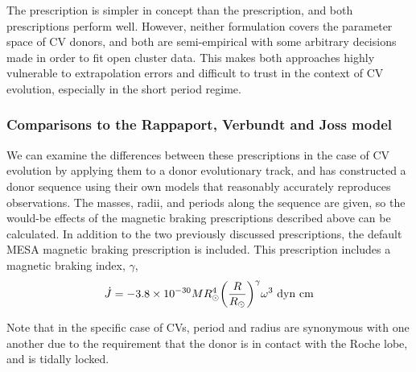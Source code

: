 The \citet{garraffo2018a} prescription is simpler in concept than the \citet{matt2015} prescription, and both prescriptions perform well. However, neither formulation covers the parameter space of CV donors, and both are semi-empirical with some arbitrary decisions made in order to fit open cluster data. This makes both approaches highly vulnerable to extrapolation errors and difficult to trust in the context of CV evolution, especially in the short period regime.


\subsubsection{Comparisons to the Rappaport, Verbundt and Joss model}

We can examine the differences between these prescriptions in the case of CV evolution by applying them to a donor evolutionary track, and \citet{knigge11} has constructed a donor sequence using their own models that reasonably accurately reproduces observations. The masses, radii, and periods along the sequence are given, so the would-be effects of the magnetic braking prescriptions described above can be calculated. In addition to the two previously discussed prescriptions, the default MESA \citep{Paxton_2015} magnetic braking prescription \citep{rappaport1983} is included. This prescription includes a magnetic braking index, $\gamma$,
\begin{equation}
    \dot J = -3.8\times10^{-30} M R_\odot^4 \bigg( \frac{R}{R_\odot} \bigg)^\gamma \omega^3\  {\rm dyn\ cm}
\end{equation}

Note that in the specific case of CVs, period and radius are synonymous with one another due to the requirement that the donor is in contact with the Roche lobe, and is tidally locked.

